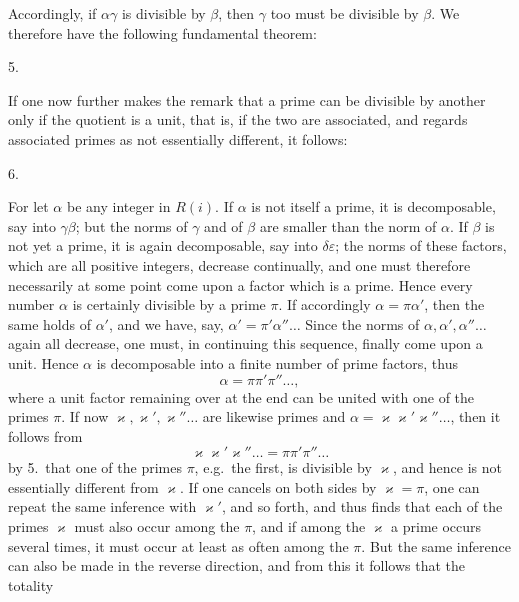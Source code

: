 Accordingly, if $\alpha\gamma$ is divisible by $\beta$, then $\gamma$ too must be
divisible by $\beta$. We therefore have the following fundamental theorem:

5. 

If one now further makes the remark that a prime can be
divisible by another only if the quotient
is a unit, that is, if the two are associated, and regards
associated primes as not essentially different, it follows:

6. 

For let $\alpha$ be any integer in $R(i)$. If $\alpha$ is not
itself a prime, it is decomposable, say into $\gamma\beta$; but the norms
of $\gamma$ and of $\beta$ are smaller than the norm of $\alpha$. If $\beta$
is not yet a prime, it is again decomposable, say into $\delta\varepsilon$; the
norms of these factors, which are all positive integers,
decrease continually, and one must therefore necessarily at some point come upon
a factor which is a prime. Hence every number $\alpha$
is certainly divisible by a prime $\pi$. If accordingly $\alpha = \pi\alpha'$,
then the same holds of $\alpha'$, and we have, say, $\alpha' = \pi'\alpha'' \dots$ Since the
norms of $\alpha, \alpha', \alpha'' \dots$ again all decrease, one must,
in continuing this sequence, finally come upon a unit.
Hence $\alpha$ is decomposable into a finite number of prime factors,
thus
\[
\alpha = \pi\pi'\pi'' \dots,
\]
where a unit factor remaining over at the end can be united with one of the
primes $\pi$. If now $\varkappa, \varkappa', \varkappa'' \dots$
are likewise primes and $\alpha = \varkappa\varkappa'\varkappa'' \dots$, then it follows from
\[
\varkappa\varkappa'\varkappa'' \dots = \pi\pi'\pi'' \dots
\]
by 5.\ that one of the primes $\pi$, e.g.\ the first, is divisible by $\varkappa$,
and hence is not essentially different from $\varkappa$. If one cancels
on both sides by $\varkappa = \pi$, one can repeat the same inference with $\varkappa'$,
and so forth, and thus finds that each of the primes $\varkappa$
must also occur among the $\pi$, and if among the $\varkappa$ a
prime occurs several times, it must occur at least as
often among the $\pi$. But the same inference can also be
made in the reverse direction, and from this it follows that the totality
